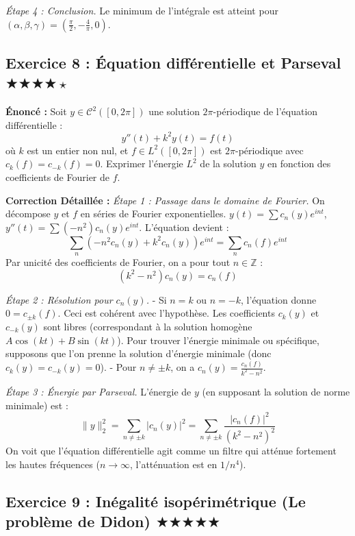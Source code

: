 \documentclass[11pt,a4paper]{article}
\begin{document}
\textit{Étape 4 : Conclusion.}
Le minimum de l'intégrale est atteint pour $(\alpha, \beta, \gamma) = \left(\frac{\pi}{2}, -\frac{4}{\pi}, 0\right)$.

\vspace{1cm}
\subsection*{Exercice 8 : Équation différentielle et Parseval $\bigstar\bigstar\bigstar\bigstar\star$}

\textbf{Énoncé :} Soit $y \in \mathcal{C}^2([0, 2\pi])$ une solution $2\pi$-périodique de l'équation différentielle :
$$y''(t) + k^2 y(t) = f(t)$$
où $k$ est un entier non nul, et $f \in L^2([0, 2\pi])$ est $2\pi$-périodique avec $c_k(f) = c_{-k}(f) = 0$.
Exprimer l'énergie $L^2$ de la solution $y$ en fonction des coefficients de Fourier de $f$.

\textbf{Correction Détaillée :}
\textit{Étape 1 : Passage dans le domaine de Fourier.}
On décompose $y$ et $f$ en séries de Fourier exponentielles.
$y(t) = \sum c_n(y) e^{int}$, $y''(t) = \sum (-n^2) c_n(y) e^{int}$.
L'équation devient :
$$\sum_{n} (-n^2 c_n(y) + k^2 c_n(y)) e^{int} = \sum_{n} c_n(f) e^{int}$$
Par unicité des coefficients de Fourier, on a pour tout $n \in \mathbb{Z}$ :
$$(k^2 - n^2) c_n(y) = c_n(f)$$

\textit{Étape 2 : Résolution pour $c_n(y)$.}
- Si $n = k$ ou $n = -k$, l'équation donne $0 = c_{\pm k}(f)$. Ceci est cohérent avec l'hypothèse. Les coefficients $c_k(y)$ et $c_{-k}(y)$ sont libres (correspondant à la solution homogène $A \cos(kt) + B \sin(kt)$). Pour trouver l'énergie minimale ou spécifique, supposons que l'on prenne la solution d'énergie minimale (donc $c_k(y) = c_{-k}(y) = 0$).
- Pour $n \neq \pm k$, on a $c_n(y) = \frac{c_n(f)}{k^2 - n^2}$.

\textit{Étape 3 : Énergie par Parseval.}
L'énergie de $y$ (en supposant la solution de norme minimale) est :
$$\|y\|_2^2 = \sum_{n \neq \pm k} |c_n(y)|^2 = \sum_{n \neq \pm k} \frac{|c_n(f)|^2}{(k^2 - n^2)^2}$$
On voit que l'équation différentielle agit comme un filtre qui atténue fortement les hautes fréquences ($n \to \infty$, l'atténuation est en $1/n^4$).

\vspace{1cm}
\subsection*{Exercice 9 : Inégalité isopérimétrique (Le problème de Didon) $\bigstar\bigstar\bigstar\bigstar\bigstar$}
\end{document}
